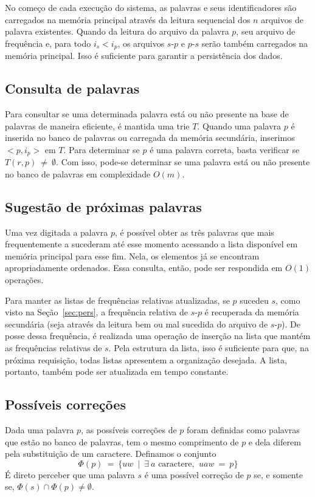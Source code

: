 \documentclass[12pt]{article}
\begin{document}
    No começo de cada execução do sistema, as palavras e seus identificadores são carregados na memória principal através da leitura sequencial dos $n$ arquivos de palavra existentes.
    Quando da leitura do arquivo da palavra $p$, seu arquivo de frequência e, para todo $i_s < i_p$, os arquivos $s$-$p$ e $p$-$s$ serão também carregados na memória principal.
    Isso é suficiente para garantir a persistência dos dados.

    \subsection{Consulta de palavras}
    Para consultar se uma determinada palavra está ou não presente na base de palavras de maneira eficiente, é mantida uma trie $T$.
    Quando uma palavra $p$ é inserida no banco de palavras ou carregada da memória secundária, inserimos $<p, i_p>$ em $T$.
    Para determinar se $p$ é uma palavra correta, basta verificar se $T(r, p)~\ne~\emptyset$.
    Com isso, pode-se determinar se uma palavra está ou não presente no banco de palavras em complexidade $O(m)$.

    \subsection{Sugestão de próximas palavras}
    Uma vez digitada a palavra $p$, é possível obter as três palavras que mais frequentemente a sucederam até esse momento acessando a lista disponível em memória principal para esse fim.
    Nela, os elementos já se encontram apropriadamente ordenados.
    Essa consulta, então, pode ser respondida em $O(1)$ operações.

    Para manter as listas de frequências relativas atualizadas, se $p$ sucedeu $s$, como visto na Seção~\ref{sec:pers}, a frequência relativa de $s$-$p$ é recuperada da memória secundária (seja através da leitura bem ou mal sucedida do arquivo de $s$-$p$).
    De posse dessa frequência, é realizada uma operação de inserção na lista que mantém as frequências relativas de $s$.
    Pela estrutura da lista, isso é suficiente para que, na próxima requisição, todas listas apresentem a organização desejada.
    A lista, portanto, também pode ser atualizada em tempo constante.

    \subsection{Possíveis correções}
    Dada uma palavra $p$, as possíveis correções de $p$ foram definidas como palavras que estão no banco de palavras, tem o mesmo comprimento de $p$ e dela diferem pela substituição de um caractere.
    Definamos o conjunto $$\Phi(p)~=~\{uw~\mid~\exists~a \text{ caractere, }~uaw~=~p\}$$
    É direto perceber que uma palavra $s$ é uma possível correção de $p$ se, e somente se, $\Phi(s) \cap \Phi(p) \ne \emptyset$.
\end{document}
